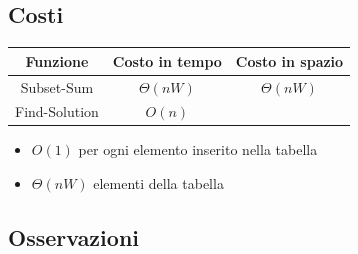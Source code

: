 \subsection{Costi}

\begin{center}
  \begin{tabular}{ |c|c|c| }
    \hline
    \textbf{Funzione} & \textbf{Costo in tempo} & \textbf{Costo in spazio} \\
    \hline
    Subset-Sum        & $\Theta(nW)$            & $\Theta(nW)$             \\
    \hline
    Find-Solution     & $O(n)$                  &                          \\
    \hline
  \end{tabular}
\end{center}

\begin{itemize}

  \item
        $O(1)$ per ogni elemento inserito nella tabella
  \item
        $\Theta(nW)$ elementi della tabella
\end{itemize}


\subsection{Osservazioni}

